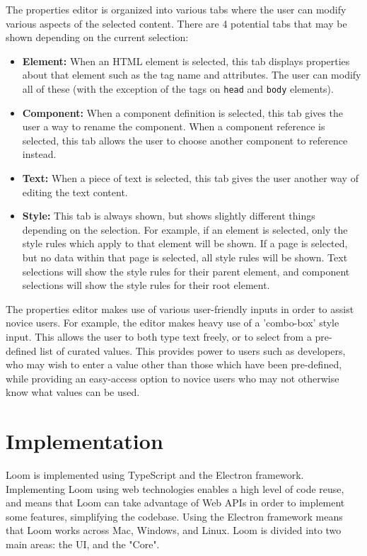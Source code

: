 \documentclass[conference, letterpaper]{IEEEtran}
\begin{document}
The properties editor is organized into various tabs where the user can modify various aspects of the selected content. There are 4 potential tabs that may be shown depending on the current selection:
\begin{itemize}
  \item \textbf{Element:} When an HTML element is selected, this tab displays properties about that element such as the tag name and attributes. The user can modify all of these (with the exception of the tags on \texttt{head} and \texttt{body} elements).
  \item \textbf{Component:} When a component definition is selected, this tab gives the user a way to rename the component. When a component reference is selected, this tab allows the user to choose another component to reference instead.
  \item \textbf{Text:} When a piece of text is selected, this tab gives the user another way of editing the text content.
  \item \textbf{Style:} This tab is always shown, but shows slightly different things depending on the selection. For example, if an element is selected, only the style rules which apply to that element will be shown. If a page is selected, but no data within that page is selected, all style rules will be shown. Text selections will show the style rules for their parent element, and component selections will show the style rules for their root element.
\end{itemize}

The properties editor makes use of various user-friendly inputs in order to assist novice users. For example, the editor makes heavy use of a 'combo-box' style input. This allows the user to both type text freely, or to select from a pre-defined list of curated values. This provides power to users such as developers, who may wish to enter a value other than those which have been pre-defined, while providing an easy-access option to novice users who may not otherwise know what values can be used.

\section{Implementation}
Loom is implemented using TypeScript and the Electron framework. Implementing Loom using web technologies enables a high level of code reuse, and means that Loom can take advantage of Web APIs in order to implement some features, simplifying the codebase. Using the Electron framework means that Loom works across Mac, Windows, and Linux. Loom is divided into two main areas: the UI, and the "Core".
\end{document}
